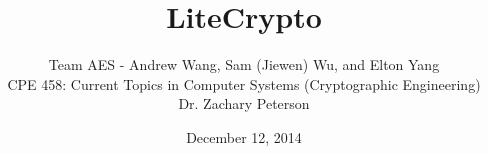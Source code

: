 \documentclass[12pt]{article}
\begin{document}
\title{\vfill LiteCrypto} %
\author{
Team AES - Andrew Wang, Sam (Jiewen) Wu, and Elton Yang \vspace{10pt} \\
CPE 458: Current Topics in Computer Systems (Cryptographic Engineering)  \vspace{10pt} \\
Dr. Zachary Peterson \vspace{10pt} \\
}
\date{December 12, 2014} %

\maketitle

\vfill  %
\begin{abstract}
\end{abstract}
\thispagestyle{empty} %
\newpage
\thispagestyle{empty}
\tableofcontents
\thispagestyle{empty}
\mbox{}
\newpage
\end{document}
